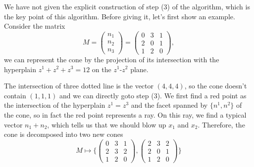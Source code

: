 \documentclass[12pt]{article}
\theoremstyle{definition}
\theoremstyle{plain}
\begin{document}
We have not given the explicit construction of step (3) of the algorithm, 
which is the key point of this algorithm. Before giving it, let's first 
show an example. Consider the matrix
\[
	M=\left(
		\begin{array}{ccc}
			n_1 \\
			n_2 \\
			n_3
		\end{array}
	\right)
	=\left(
		\begin{array}{ccc}
			0 & 3 & 1 \\
			2 & 0 & 1 \\
			1 & 2 & 0
		\end{array}
	\right),
\]
we can represent the cone by the projection of its intersection with 
the hyperplain $z^1+z^2+z^3=12$ on the $z^1$-$z^2$ plane.
\begin{center}
\end{center}
The intersection of three dotted line is the vector $(4,4,4)$, 
so the cone doesn't contain $(1,1,1)$ and we can directly goto step (3).
We first find a red point as the intersection of the hyperplain 
$z^1=z^3$ and the facet spanned by $\{n^1,n^2\}$ of the cone, 
so in fact the red point represents a ray.
On this ray, we find a typical vector $n_1+n_2$, 
which tells us that we should blow up $x_1$ and $x_2$.
Therefore, the cone is decomposed into two new cones 
\[
	M\mapsto \biggl\{
		\begin{pmatrix}
			0&3&1\\
			2&3&2\\
			1&2&0
		\end{pmatrix},
		\begin{pmatrix}
			2&3&2\\
			2&0&1\\
			1&2&0
		\end{pmatrix}
	\biggr\}
\] 
\end{document}
